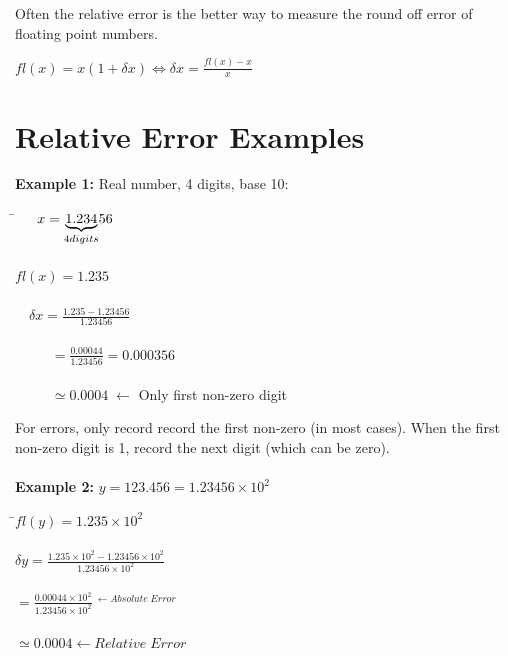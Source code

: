\documentclass[a4paper,12pt]{report}
\begin{document}
	Often the relative error is the better way to measure the round off error of floating point numbers.

\begin{center}
	$fl(x)=x(1+ \delta x) \Leftrightarrow \delta x = \frac{fl(x)-x}{x}$
\end{center}

\section{Relative Error Examples}

	\textbf{Example 1:} Real number, 4 digits, base 10:

\begin{tabbing}
	\hspace{3cm}\=$\quad \; \; x= \underbrace{1.234}_{\tiny{4digits}}\!56$\\
	\> \\
	\>$fl(x)=1.235$\\
	\> \\
	\>\large{$\quad \!  \delta x = \frac{1.235-1.23456}{1.23456}$}\\
	\> \\
	\>$\qquad \; \; = \frac{0.00044}{1.23456}=0.000356$\\
	\> \\
	\> $\qquad \; \; \simeq 0.0004 \; \leftarrow$ \footnotesize{Only first non-zero digit}
\end{tabbing}

	For errors, only record record the first non-zero (in most cases). When the first non-zero digit is 1, 
	record the next digit (which can be zero).\\ \\

	\noindent \textbf{Example 2:} $y=123.456 = 1.23456 \times 10^2$

\begin{tabbing}
	\hspace{3.5cm}\=$fl(y)=1.235 \times 10^2$\\
	\> \\
	\> \quad \large{$\delta y = \frac{1.235 \times 10^2-1.23456 \times 10^2}{1.23456 \times 10^2}$}\\
	\> \\
	\> \qquad \; \large{$= \frac{0.00044 \times 10^2}{1.23456 \times 10^2}\, ^{\leftarrow Absolute \; Error}$}\\
	\> \\
	\> \qquad \; $\simeq 0.0004{\leftarrow Relative \; Error}$
\end{tabbing}
\end{document}
